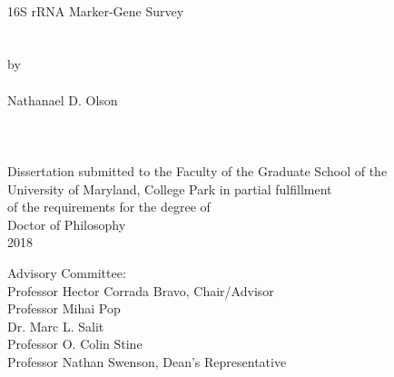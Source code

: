
\thispagestyle{empty}
\hbox{\ }
\vspace{1in}
\renewcommand{\baselinestretch}{1}
\small\normalsize
\begin{center}

\large{{16S rRNA Marker-Gene Survey}}\\
\ \\
\ \\
\large{by} \\
\ \\
\large{Nathanael D. Olson}%
\ \\
\ \\
\ \\
\ \\
\normalsize
Dissertation submitted to the Faculty of the Graduate School of the \\
University of Maryland, College Park in partial fulfillment \\
of the requirements for the degree of \\
Doctor of Philosophy \\
2018
\end{center}

\vspace{7.5em}

\noindent Advisory Committee: \\
Professor Hector Corrada Bravo, Chair/Advisor \\
Professor Mihai Pop \\
Dr. Marc L. Salit \\
Professor O. Colin Stine \\
Professor Nathan Swenson, Dean's Representative
